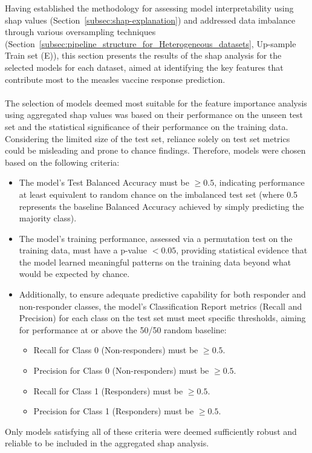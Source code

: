 \documentclass[12pt,a4paper]{report}
\begin{document}
\noindent
Having established the methodology for assessing model interpretability using \gls{shap} values (Section~\ref{subsec:shap-explanation}) and addressed data imbalance through various oversampling techniques (Section~\ref{subsec:pipeline_structure_for_Heterogeneous_datasets}, Up-sample Train set (E)), this section presents the results of the \gls{shap} analysis for the selected models for each dataset, aimed at identifying the key features that contribute most to the measles vaccine response prediction.\\
\\
The selection of models deemed most suitable for the feature importance analysis using aggregated \gls{shap} values was based on their performance on the unseen test set and the statistical significance of their performance on the training data. Considering the limited size of the test set, reliance solely on test set metrics could be misleading and prone to chance findings. Therefore, models were chosen based on the following criteria:
\begin{itemize}
    \item The model's Test Balanced Accuracy must be $\geq 0.5$, indicating performance at least equivalent to random chance on the imbalanced test set (where 0.5 represents the baseline Balanced Accuracy achieved by simply predicting the majority class).
    \item The model's training performance, assessed via a permutation test on the training data, must have a p-value $< 0.05$, providing statistical evidence that the model learned meaningful patterns on the training data beyond what would be expected by chance.
    \item Additionally, to ensure adequate predictive capability for both responder and non-responder classes, the model's Classification Report metrics (Recall and Precision) for each class on the test set must meet specific thresholds, aiming for performance at or above the 50/50 random baseline:
    \begin{itemize}
        \item Recall for Class 0 (Non-responders) must be $\geq 0.5$.
        \item Precision for Class 0 (Non-responders) must be $\geq 0.5$.
        \item Recall for Class 1 (Responders) must be $\geq 0.5$.
        \item Precision for Class 1 (Responders) must be $\geq 0.5$.
    \end{itemize}
\end{itemize}
Only models satisfying all of these criteria were deemed sufficiently robust and reliable to be included in the aggregated \gls{shap} analysis.
\end{document}

